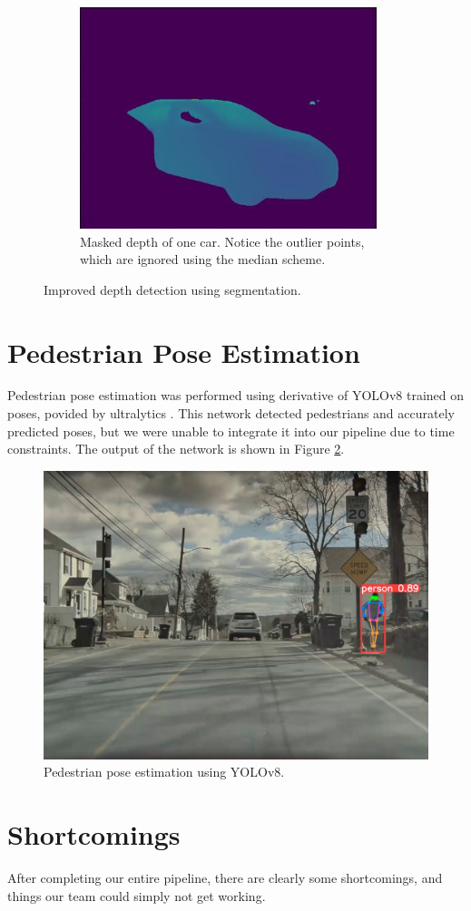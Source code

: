 \begin{figure}
\begin{subfigure}{0.9\linewidth}
    \includegraphics[width=0.95\textwidth]{images/masked_depth.jpg}
    \caption{Masked depth of one car. Notice the outlier points, which are ignored using the median scheme.}
  \end{subfigure}
  \caption{Improved depth detection using segmentation.}
  \label{fig:depth}
\end{figure}

\section{Pedestrian Pose Estimation}
Pedestrian pose estimation was performed using derivative of YOLOv8 trained on poses, povided by ultralytics \cite{YOLOv8Pose}. This network detected pedestrians and accurately predicted poses, but we were unable to integrate it into our pipeline due to time constraints. The output of the network is shown in Figure \ref{fig:pedestrian_pose}.

\begin{figure}
  \centering
  \includegraphics[width=0.95\linewidth]{images/pedestrian_pose.jpg}
  \caption{Pedestrian pose estimation using YOLOv8.}
  \label{fig:pedestrian_pose}
\end{figure}

\section{Shortcomings}
After completing our entire pipeline, there are clearly some shortcomings, and things our team could simply not get working.